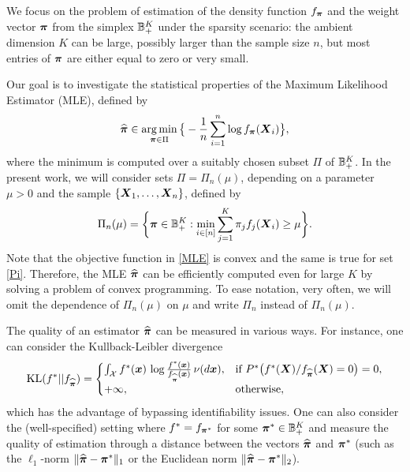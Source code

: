 We focus on the problem of estimation of the density function $f_{\boldsymbol \pi}$ and the weight vector $\boldsymbol \pi$ from the simplex
${\mathbb B}_+^K$ under the sparsity scenario: the ambient dimension $K$ can be large, possibly larger than the sample size
$n$, but most entries of $\boldsymbol \pi$ are either equal to zero or very small.

Our goal is to investigate the statistical properties of the Maximum Likelihood Estimator (MLE), defined by
\begin{equation}\label{MLE}
\widehat{\boldsymbol \pi} \in \operatorname*{arg\,min}_{\boldsymbol \pi\in \Pi}\big\{-\frac{1}{n}\sum_{i=1}^n\log f_{\boldsymbol \pi}(\boldsymbol X_i)\big\},
\end{equation}
where the minimum is computed over a suitably chosen subset $\Pi$ of ${\mathbb B}_+^K$. In the present work, we will consider
sets $\Pi=\Pi_n(\mu)$, depending on a parameter $\mu>0$ and the sample $\{\boldsymbol X_1,\ldots,\boldsymbol X_n\}$, defined by
\begin{equation}\label{Pi}
\Pi_n(\mu) = \bigg\{\boldsymbol \pi\in {\mathbb B}_+^K: \min_{i\in [n]}\sum_{j=1}^K \pi_j f_j(\boldsymbol X_i)\geq \mu\bigg\}.
\end{equation}
Note that the objective function in \eqref{MLE} is convex and the same is true for set \eqref{Pi}. Therefore, the MLE
$\widehat{\boldsymbol \pi}$ can be efficiently computed even for large $K$ by solving a problem of convex programming. To ease notation, very often,
we will omit the dependence of $\Pi_n(\mu)$ on $\mu$ and write $\Pi_n$ instead of $\Pi_n(\mu)$.

The quality of an estimator $\widehat{\boldsymbol \pi}$ can be measured in various ways. For instance, one can consider
the Kullback-Leibler divergence 
\begin{equation}
{\rm KL}(f^* ||f_{\widehat{\boldsymbol \pi}}) = 
\begin{cases}
\int_{\mathcal X} f^*(\boldsymbol x)\,\log \frac{f^*(\boldsymbol x)}{f_{\widehat{\boldsymbol \pi}}(\boldsymbol x)}\,\nu(d\boldsymbol x), &
\text{if } P^*\big(f^*(\boldsymbol X)/f_{\widehat{\boldsymbol \pi}}(\boldsymbol X)=0 \big)=0, \\
+\infty, & \text{otherwise},
\end{cases}
\end{equation}
which has the advantage of bypassing identifiability
issues. One can also consider the (well-specified) setting where $f^*=f_{\boldsymbol \pi^*}$ for some $\boldsymbol \pi^*\in{\mathbb B}^K_+$
and measure the quality of estimation through a distance between the vectors $\widehat{\boldsymbol \pi}$ and $\boldsymbol \pi^*$ (such as
the $\ell_1$-norm $\|\widehat{\boldsymbol \pi}-\boldsymbol \pi^*\|_1$ or the Euclidean norm $\|\widehat{\boldsymbol \pi}-\boldsymbol \pi^*\|_2$).

